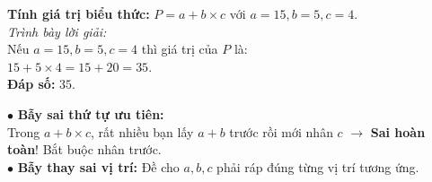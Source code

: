 \documentclass[14pt,a4paper,oneside]{extbook}
\begin{document}
\noindent
\begin{minipage}[t]{0.54\textwidth}
  \begin{tcolorbox}[
    enhanced,
    title={\footnotesize\bfseries\color{white}\faPencilSquareO\ Ví dụ mẫu chuẩn sư phạm},
    colback=green!3!white,
    colframe=green!60!black,
    arc=2.5mm, boxrule=0.8pt, top=1.8mm, bottom=1.8mm, left=2.2mm, right=2.2mm
  ]
    \footnotesize
    \textbf{Tính giá trị biểu thức:} $P = a + b \times c$ với $a = 15, b = 5, c = 4$.\\
    \textit{Trình bày lời giải:}\\
    Nếu $a = 15, b = 5, c = 4$ thì giá trị của $P$ là:\\
    $15 + 5 \times 4 = 15 + 20 = 35$.\\
    \textbf{Đáp số:} $35$.
  \end{tcolorbox}
\end{minipage}%
\hfill
\begin{minipage}[t]{0.44\textwidth}
  \begin{tcolorbox}[
    enhanced,
    title={\footnotesize\bfseries\color{white}\faExclamationTriangle\ Mẹo tránh bẫy trắc nghiệm},
    colback=red!2!white,
    colframe=red!70!black,
    arc=2.5mm, boxrule=0.8pt, top=1.8mm, bottom=1.8mm, left=2.2mm, right=2.2mm
  ]
    \footnotesize
    $\bullet$ \textbf{Bẫy sai thứ tự ưu tiên:}\\
    Trong $a + b \times c$, rất nhiều bạn lấy $a + b$ trước rồi mới nhân $c$ $\rightarrow$ \textbf{Sai hoàn toàn}! Bắt buộc nhân trước.\\
    $\bullet$ \textbf{Bẫy thay sai vị trí:} Đề cho $a, b, c$ phải ráp đúng từng vị trí tương ứng.
  \end{tcolorbox}
\end{minipage}
\end{document}
